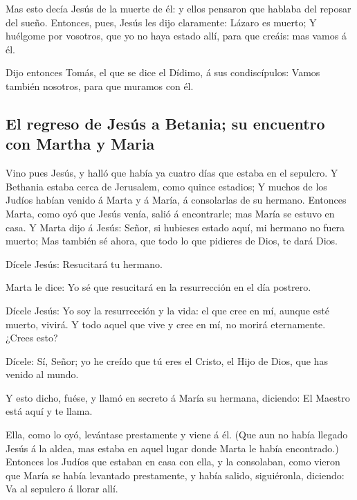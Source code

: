  Mas esto decía Jesús de la muerte de él: y ellos
pensaron que hablaba del reposar del sueño.  Entonces,
pues, Jesús les dijo claramente: Lázaro es muerto;  Y
huélgome por vosotros, que yo no haya estado allí, para que creáis: mas
vamos á él.

 Dijo entonces Tomás, el que se dice el Dídimo, á sus
condiscípulos: Vamos también nosotros, para que muramos con él.

\hypertarget{el-regreso-de-jesuxfas-a-betania-su-encuentro-con-martha-y-maria}{%
\subsection{El regreso de Jesús a Betania; su encuentro con Martha y
Maria}\label{el-regreso-de-jesuxfas-a-betania-su-encuentro-con-martha-y-maria}}

 Vino pues Jesús, y halló que había ya cuatro días que
estaba en el sepulcro.  Y Bethania estaba cerca de
Jerusalem, como quince estadios;  Y muchos de los Judíos
habían venido á Marta y á María, á consolarlas de su hermano.
 Entonces Marta, como oyó que Jesús venía, salió á
encontrarle; mas María se estuvo en casa.  Y Marta dijo á
Jesús: Señor, si hubieses estado aquí, mi hermano no fuera muerto;
 Mas también sé ahora, que todo lo que pidieres de Dios,
te dará Dios.

 Dícele Jesús: Resucitará tu hermano.

 Marta le dice: Yo sé que resucitará en la resurrección
en el día postrero.

 Dícele Jesús: Yo soy la resurrección y la vida: el que
cree en mí, aunque esté muerto, vivirá.  Y todo aquel que
vive y cree en mí, no morirá eternamente. ¿Crees esto?

 Dícele: Sí, Señor; yo he creído que tú eres el Cristo,
el Hijo de Dios, que has venido al mundo.

 Y esto dicho, fuése, y llamó en secreto á María su
hermana, diciendo: El Maestro está aquí y te llama.

 Ella, como lo oyó, levántase prestamente y viene á él.
 (Que aun no había llegado Jesús á la aldea, mas estaba
en aquel lugar donde Marta le había encontrado.) 
Entonces los Judíos que estaban en casa con ella, y la consolaban, como
vieron que María se había levantado prestamente, y había salido,
siguiéronla, diciendo: Va al sepulcro á llorar allí.


